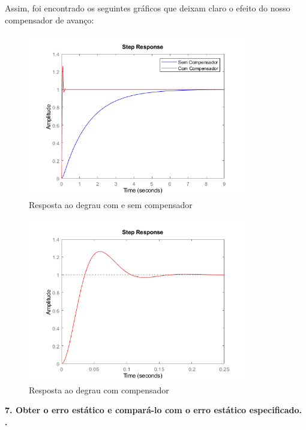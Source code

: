 Assim, foi encontrado os seguintes gráficos que deixam claro o efeito do nosso compensador de avanço:

\begin{figure}[H]
  \centering
  \includegraphics[width=0.85\textwidth]{images/fig5.png}
  \caption{Resposta ao degrau com e sem compensador}
\end{figure}

\begin{figure}[H]
  \centering
  \includegraphics[width=0.85\textwidth]{images/fig6.png}
  \caption{Resposta ao degrau com compensador}
\end{figure} \newpage


\noindent \textbf{7. Obter o erro estático e compará-lo com o erro estático especificado. .}\\

